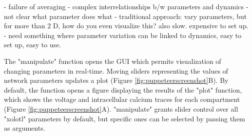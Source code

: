 \documentclass{frontiersSCNS} %
\begin{document}
- failure of averaging
- complex interrelationships b/w parameters and dynamics
- not clear what parameter does what
- traditional approach: vary parameters, but for more than 2 D, how do you even visualize this? also slow. expensive to set up. 
- need something where parameter variation can be linked to dynamics, easy to set up, easy to use. 

The "manipulate" function opens the GUI which permits visualization of changing parameters in real-time. Moving sliders representing the values of network parameters updates a plot (Figure \ref{fig:puppeteerscreenshot}B). By default, the function opens a figure displaying the results of the "plot" function, which shows the voltage and intracellular calcium traces for each compartment (Figure \ref{fig:puppeteerscreenshot}A). "manipulate" grants slider control over all "xolotl" parameters by default, but specific ones can be selected by passing them as arguments.
\end{document}
